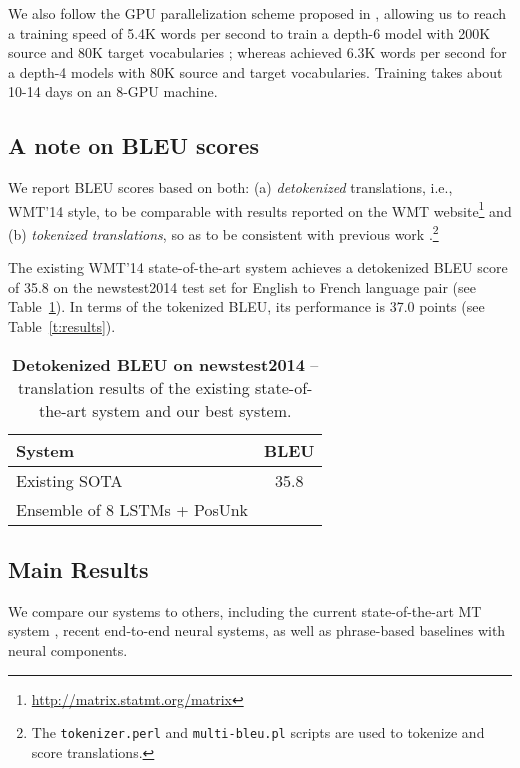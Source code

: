 We also follow the GPU parallelization scheme proposed in \cite{sutskever14}, allowing us to  
reach a training speed of 5.4K words per second to train a depth-6 model with 200K source and 80K target vocabularies  
; whereas  achieved 6.3K words per 
second for a depth-4 models with 80K source and target vocabularies.
Training takes about 10-14 days on an 8-GPU machine.

\subsection{A note on BLEU scores}
We report BLEU scores based on both: (a) {\it detokenized} translations, i.e., WMT'14 style, to be comparable with results reported on the WMT website\footnote{\url{http://matrix.statmt.org/matrix}} and (b) {\it tokenized translations}, so as to be consistent with previous work \cite{cho14,bog15,wmt14_en_fr,sutskever14,jean15}.\footnote{The \texttt{tokenizer.perl} and \texttt{multi-bleu.pl} scripts are used to tokenize and score translations.}

The existing WMT'14 state-of-the-art system \cite{durrani-EtAl:2014:W14-33} achieves a detokenized BLEU score of 35.8 on 
the newstest2014 test set for English to French language pair (see Table~\ref{t:results_wmt}). In terms of the tokenized BLEU, its performance is 37.0 points (see Table~\ref{t:results}).
\begin{table}[tbh!]
\centering
\begin{tabular}{l|c}
\bf{System} & \bf{BLEU}\\
  \hline
Existing SOTA \cite{durrani-EtAl:2014:W14-33} & 35.8\\
  \hline
Ensemble of 8 LSTMs + PosUnk  & {\bf \bestbleuunkwmt{}}\\
\end{tabular}
\caption[Detokenized BLEU on newstest2014]{{\bf Detokenized BLEU on newstest2014} -- translation results of the existing state-of-the-art system and our best system.}
\label{t:results_wmt}
\end{table}


\subsection{Main Results}
We compare our systems to others, including the current state-of-the-art MT system \cite{durrani-EtAl:2014:W14-33},
recent end-to-end neural systems, as well as phrase-based baselines with neural components.

